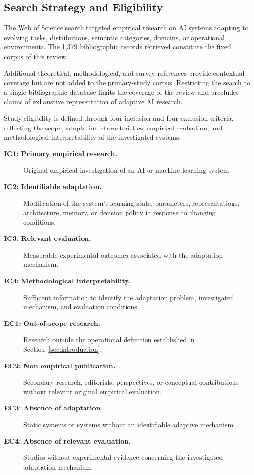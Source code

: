 \subsection{Search Strategy and Eligibility}

The Web of Science search targeted empirical
research on AI systems adapting to evolving tasks,
distributions, semantic categories, domains, or
operational environments. The 1,379 bibliographic
records retrieved constitute the fixed corpus of
this review.

Additional theoretical, methodological, and survey
references provide contextual coverage but are not
added to the primary-study corpus. Restricting the
search to a single bibliographic database limits
the coverage of the review and precludes claims
of exhaustive representation of adaptive AI research.

Study eligibility is defined through four inclusion
and four exclusion criteria, reflecting the scope,
adaptation characteristics, empirical evaluation,
and methodological interpretability of the
investigated systems.

\begin{description}
	\item[\textbf{IC1: Primary empirical research.}]
	Original empirical investigation of an AI or
	machine learning system.
	
	\item[\textbf{IC2: Identifiable adaptation.}]
	Modification of the system's learning state,
	parameters, representations, architecture,
	memory, or decision policy in response to
	changing conditions.
	
	\item[\textbf{IC3: Relevant evaluation.}]
	Measurable experimental outcomes associated
	with the adaptation mechanism.
	
	\item[\textbf{IC4: Methodological interpretability.}]
	Sufficient information to identify the adaptation
	problem, investigated mechanism, and evaluation
	conditions.
	
	\item[\textbf{EC1: Out-of-scope research.}]
	Research outside the operational definition
	established in Section~\ref{sec:introduction}.
	
	\item[\textbf{EC2: Non-empirical publication.}]
	Secondary research, editorials, perspectives,
	or conceptual contributions without relevant
	original empirical evaluation.
	
	\item[\textbf{EC3: Absence of adaptation.}]
	Static systems or systems without an
	identifiable adaptive mechanism.
	
	\item[\textbf{EC4: Absence of relevant evaluation.}]
	Studies without experimental evidence concerning
	the investigated adaptation mechanism.
\end{description}

